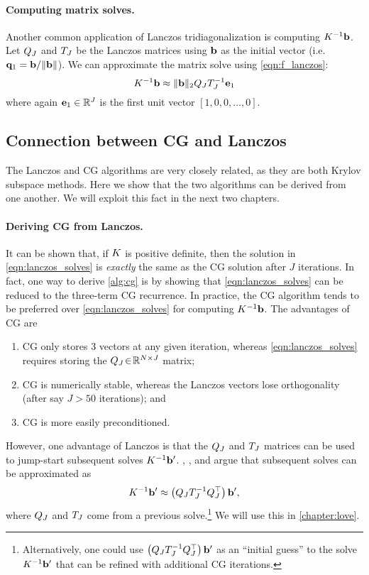\paragraph{Computing matrix solves.}
Another common application of Lanczos tridiagonalization is computing $K^{-1} \mathbf{b}$.
Let $Q_J$ and $T_J$ be the Lanczos matrices using $\mathbf{b}$ as the initial vector (i.e. $\mathbf{q}_1 = \mathbf{b} / \Vert \mathbf{b} \Vert$).
We can approximate the matrix solve using \cref{eqn:f_lanczos}:
%
\begin{equation}
  K^{-1} \mathbf{b} \approx \Vert \mathbf{b} \Vert_2 Q_J T_J^{-1} \mathbf{e}_{1}
  \label{eqn:lanczos_solves}
\end{equation}
%
where again $\mathbf{e}_{1} \in \mathbb{R}^J$ is the first unit vector $[1, 0, 0, \ldots, 0]$.




\subsection{Connection between CG and Lanczos}
\label{sec:cg_lanczos_connection}

The Lanczos and CG algorithms are very closely related, as they are both Krylov subspace methods.
Here we show that the two algorithms can be derived from one another.
We will exploit this fact in the next two chapters.

\paragraph{Deriving CG from Lanczos.}
It can be shown that, if $K$ is positive definite, then the solution in \cref{eqn:lanczos_solves} is \emph{exactly} the same as the CG solution after $J$ iterations.
In fact, one way to derive \cref{alg:cg} is by showing that \cref{eqn:lanczos_solves} can be reduced to the three-term CG recurrence.
In practice, the CG algorithm tends to be preferred over \cref{eqn:lanczos_solves} for computing $K^{-1} \mathbf{b}$.
The advantages of CG are
\begin{enumerate}
  \item CG only stores 3 vectors at any given iteration, whereas \cref{eqn:lanczos_solves} requires storing the $Q_J \! \in \! \mathbb{R}^{N \times J}$ matrix;
  \item CG is numerically stable, whereas the Lanczos vectors lose orthogonality (after say $J > 50$ iterations); and
  \item CG is more easily preconditioned.
\end{enumerate}
However, one advantage of Lanczos is that the $Q_J$ and $T_J$ matrices can be used to jump-start subsequent solves $K^{-1} \mathbf{b}'$.
\citet{parlett1980new}, \citet{saad1987lanczos}, and \citet{schneider2001krylov} argue that subsequent solves can be approximated as
%
\begin{equation}
  K^{-1} \mathbf{b}' \approx \left( Q_J T_J^{-1} Q_J^\top \right) \mathbf{b}',
  \label{eqn:lanczos_solve}
\end{equation}
%
where $Q_J$ and $T_J$ come from a previous solve.\footnote{
  Alternatively, one could use $\left( Q_J T_J^{-1} Q_J^\top \right) \mathbf{b}'$ as an ``initial guess'' to the solve $K^{-1} \mathbf{b}'$ that can be refined with additional CG iterations.
}
We will use this in \cref{chapter:love}.

